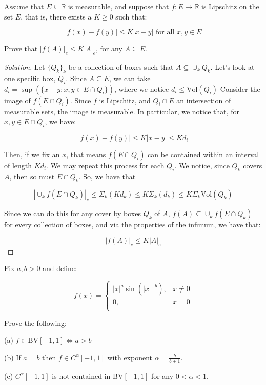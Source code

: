 \documentclass[10pt]{article}
\newcommand{\bv}{{\text{BV}}}
\newenvironment{problem}[2][Problem]{\begin{trivlist}
\item[\hskip \labelsep {\bfseries #1}\hskip \labelsep {\bfseries #2.}]}{\end{trivlist}}
\begin{document}
\begin{problem}{5.2.21}

Assume that $E \subseteq \mathbb{R}$ is measurable, and suppose that $f: E \to \mathbb{R}$ is Lipschitz on the set $E$, that is, there exists a $K \geq 0$ such that:

$$ | f(x) - f(y) | \leq K|x- y|  \text{ for all } x,y \in E$$

Prove that $|f(A)|_e \leq K|A|_e$, for any $A \subseteq E$.

\end{problem}
\begin{proof}[Solution]

Let $\{ Q_k \}_k$ be a collection of boxes such that $A \subseteq \cup_k Q_k$. Let's look at one specific box, $Q_i$. Since $A \subseteq E$, we can take $d_i = \sup(\{ x-y : x,y \in E \cap Q_i \})$, where we notice $d_i \leq \text{Vol}(Q_i)$ Consider the image of $f(E \cap Q_i)$. Since $f$ is Lipschitz, and $Q_i \cap E$ an intersection of measurable sets, the image is measurable. In particular, we notice that, for $x,y \in E \cap Q_i$, we have:

$$ |f(x) - f(y)| \leq K|x-y| \leq K d_i $$ 

Then, if we fix an $x$, that means $f(E \cap Q_i)$ can be contained within an interval of length $K d_i$. We may repeat this process for each $Q_i$. We notice, since $Q_k$ covers $A$, then so must $E \cap Q_k$. So, we have that 

$$|\cup_k f(E \cap Q_k)|_e \leq \Sigma_k (K d_k) \leq K \Sigma_k (d_k) \leq K \Sigma_k \text{Vol}(Q_k)$$

Since we can do this for any cover by boxes $Q_k$ of $A$, $f(A) \subseteq \cup_k f(E \cap Q_k)$ for every collection of boxes, and via the properties of the infimum, we have that:

$$|f(A)|_e \leq K |A|_e$$

\end{proof}

\begin{problem}{5.2.22}
Fix $a,b > 0$ and define:

$$ f(x) = \begin{cases} |x|^a \sin (|x|^{-b}), & x \not = 0 \\ 0, & x = 0\\ \end{cases} $$

Prove the following:

(a) $f \in \bv[-1,1] \iff a > b$

(b) If $a = b$ then $f \in C^\alpha[-1,1]$ with exponent $\alpha = \frac{b}{b+1}$.

(c) $ C^\alpha[-1,1]$ is not contained in $\bv[-1,1]$ for any $0 < \alpha < 1$.
\end{problem}
\end{document}

